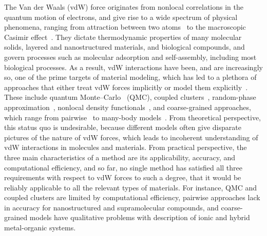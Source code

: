 

The Van der Waals (vdW) force originates from nonlocal correlations in the quantum motion of electrons, and give rise to a wide spectrum of physical phenomena, ranging from attraction between two atoms~\citep{LondonZP30} to the macroscopic Casimir effect~\citep{JaffePRD05}.
They dictate thermodynamic properties of many molecular solids, layered and nanostructured materials, and biological compounds, and govern processes such as molecular adsorption and self-assembly, including most biological processes.
As a result, vdW interactions have been, and are increasingly so, one of the prime targets of material modeling, which has led to a plethora of approaches that either treat vdW forces implicitly or model them explicitly~\citep{KlimesJCP12,GrimmeCR16,HermannCR17}.
These include quantum Monte--Carlo~\citep{AmbrosettiJPCL14} (QMC), coupled clusters~\citep{YangS14}, random-phase approximation~\citep{LuPRL09}, nonlocal density functionals~\citep{DionPRL04,VydrovPRL09}, and coarse-grained approaches, which range from pairwise~\citep{GrimmeJCC04,BeckeJCP07,TkatchenkoPRL09} to many-body models~\citep{TkatchenkoPRL12,SilvestrelliJCP13}.
From theoretical perspective, this status quo is undesirable, because different models often give disparate pictures of the nature of vdW forces, which leads to incoherent understanding of vdW interactions in molecules and materials.
From practical perspective, the three main characteristics of a method are its applicability, accuracy, and computational efficiency, and so far, no single method has satisfied all three requirements with respect to vdW forces to such a degree, that it would be reliably applicable to all the relevant types of materials.
For instance, QMC and coupled clusters are limited by computational efficiency, pairwise approaches lack in accuracy for nanostructured and supramolecular compounds, and coarse-grained models have qualitative problems with description of ionic and hybrid metal-organic systems.

